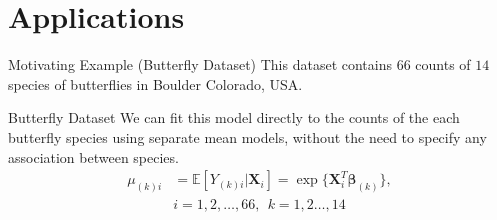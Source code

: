 \documentclass[9pt,notes=hide]{beamer}
\newcommand{\vect}[1]{\boldsymbol #1}
\newcommand{\Em}{\mathbb E}
\newcommand{\vbe}{\vect{\beta}}
\newcommand{\X}{\vect{X}}
\begin{document}
\section{Applications}

\begin{frame}{Motivating Example (Butterfly Dataset)}
	This dataset contains $66$  counts of  $14$ species of butterflies in
	Boulder Colorado, USA. \\
	\begin{table}
		\centering
		\caption{Snippet of Butterfly Counts for the $3$ most common species \parencite{Hui2013, 2006Oliver}}
	\end{table}
\end{frame}


\begin{frame}{Butterfly Dataset}
	We can fit this model directly to the counts of the  each  butterfly
	species using  separate mean models, without the need to specify any
	association  between species.
	\pause
	\begin{align*}
		\mu_{(k)i} & = \Em[Y_{(k)i}|\X_i] = \exp\{\X_i^T\vbe_{(k)}\}, \\
		           & i = 1, 2, \dots, 66,   \  \ k= 1,2   \dots, 14
	\end{align*}

\end{frame}
\end{document}
